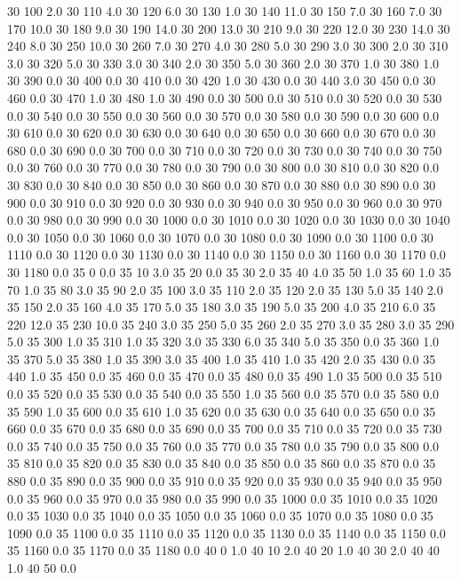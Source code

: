 30	100	2.0
30	110	4.0
30	120	6.0
30	130	1.0
30	140	11.0
30	150	7.0
30	160	7.0
30	170	10.0
30	180	9.0
30	190	14.0
30	200	13.0
30	210	9.0
30	220	12.0
30	230	14.0
30	240	8.0
30	250	10.0
30	260	7.0
30	270	4.0
30	280	5.0
30	290	3.0
30	300	2.0
30	310	3.0
30	320	5.0
30	330	3.0
30	340	2.0
30	350	5.0
30	360	2.0
30	370	1.0
30	380	1.0
30	390	0.0
30	400	0.0
30	410	0.0
30	420	1.0
30	430	0.0
30	440	3.0
30	450	0.0
30	460	0.0
30	470	1.0
30	480	1.0
30	490	0.0
30	500	0.0
30	510	0.0
30	520	0.0
30	530	0.0
30	540	0.0
30	550	0.0
30	560	0.0
30	570	0.0
30	580	0.0
30	590	0.0
30	600	0.0
30	610	0.0
30	620	0.0
30	630	0.0
30	640	0.0
30	650	0.0
30	660	0.0
30	670	0.0
30	680	0.0
30	690	0.0
30	700	0.0
30	710	0.0
30	720	0.0
30	730	0.0
30	740	0.0
30	750	0.0
30	760	0.0
30	770	0.0
30	780	0.0
30	790	0.0
30	800	0.0
30	810	0.0
30	820	0.0
30	830	0.0
30	840	0.0
30	850	0.0
30	860	0.0
30	870	0.0
30	880	0.0
30	890	0.0
30	900	0.0
30	910	0.0
30	920	0.0
30	930	0.0
30	940	0.0
30	950	0.0
30	960	0.0
30	970	0.0
30	980	0.0
30	990	0.0
30	1000	0.0
30	1010	0.0
30	1020	0.0
30	1030	0.0
30	1040	0.0
30	1050	0.0
30	1060	0.0
30	1070	0.0
30	1080	0.0
30	1090	0.0
30	1100	0.0
30	1110	0.0
30	1120	0.0
30	1130	0.0
30	1140	0.0
30	1150	0.0
30	1160	0.0
30	1170	0.0
30	1180	0.0
35	0	0.0
35	10	3.0
35	20	0.0
35	30	2.0
35	40	4.0
35	50	1.0
35	60	1.0
35	70	1.0
35	80	3.0
35	90	2.0
35	100	3.0
35	110	2.0
35	120	2.0
35	130	5.0
35	140	2.0
35	150	2.0
35	160	4.0
35	170	5.0
35	180	3.0
35	190	5.0
35	200	4.0
35	210	6.0
35	220	12.0
35	230	10.0
35	240	3.0
35	250	5.0
35	260	2.0
35	270	3.0
35	280	3.0
35	290	5.0
35	300	1.0
35	310	1.0
35	320	3.0
35	330	6.0
35	340	5.0
35	350	0.0
35	360	1.0
35	370	5.0
35	380	1.0
35	390	3.0
35	400	1.0
35	410	1.0
35	420	2.0
35	430	0.0
35	440	1.0
35	450	0.0
35	460	0.0
35	470	0.0
35	480	0.0
35	490	1.0
35	500	0.0
35	510	0.0
35	520	0.0
35	530	0.0
35	540	0.0
35	550	1.0
35	560	0.0
35	570	0.0
35	580	0.0
35	590	1.0
35	600	0.0
35	610	1.0
35	620	0.0
35	630	0.0
35	640	0.0
35	650	0.0
35	660	0.0
35	670	0.0
35	680	0.0
35	690	0.0
35	700	0.0
35	710	0.0
35	720	0.0
35	730	0.0
35	740	0.0
35	750	0.0
35	760	0.0
35	770	0.0
35	780	0.0
35	790	0.0
35	800	0.0
35	810	0.0
35	820	0.0
35	830	0.0
35	840	0.0
35	850	0.0
35	860	0.0
35	870	0.0
35	880	0.0
35	890	0.0
35	900	0.0
35	910	0.0
35	920	0.0
35	930	0.0
35	940	0.0
35	950	0.0
35	960	0.0
35	970	0.0
35	980	0.0
35	990	0.0
35	1000	0.0
35	1010	0.0
35	1020	0.0
35	1030	0.0
35	1040	0.0
35	1050	0.0
35	1060	0.0
35	1070	0.0
35	1080	0.0
35	1090	0.0
35	1100	0.0
35	1110	0.0
35	1120	0.0
35	1130	0.0
35	1140	0.0
35	1150	0.0
35	1160	0.0
35	1170	0.0
35	1180	0.0
40	0	1.0
40	10	2.0
40	20	1.0
40	30	2.0
40	40	1.0
40	50	0.0
